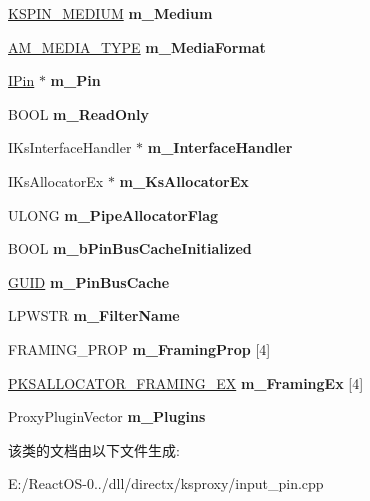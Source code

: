 \begin{DoxyCompactItemize}
\hyperlink{struct_k_s_i_d_e_n_t_i_f_i_e_r}{K\+S\+P\+I\+N\+\_\+\+M\+E\+D\+I\+UM} {\bfseries m\+\_\+\+Medium}
\item 
\mbox{\label{class_c_input_pin_a848d0d972f45dd8cdad72666ea01465e}} 
\hyperlink{struct_a_m___m_e_d_i_a___t_y_p_e}{A\+M\+\_\+\+M\+E\+D\+I\+A\+\_\+\+T\+Y\+PE} {\bfseries m\+\_\+\+Media\+Format}
\item 
\mbox{\label{class_c_input_pin_abe9432ddb342eee4e0a8b57692e96e1b}} 
\hyperlink{interface_i_pin}{I\+Pin} $\ast$ {\bfseries m\+\_\+\+Pin}
\item 
\mbox{\label{class_c_input_pin_ad4ca388cdb28e577d3fd585e6dd40b10}} 
B\+O\+OL {\bfseries m\+\_\+\+Read\+Only}
\item 
\mbox{\label{class_c_input_pin_a3848baf8b5531dd3091b04a546a383ef}} 
I\+Ks\+Interface\+Handler $\ast$ {\bfseries m\+\_\+\+Interface\+Handler}
\item 
\mbox{\label{class_c_input_pin_ab4b94a3ac219fee4452865f2f82672dc}} 
I\+Ks\+Allocator\+Ex $\ast$ {\bfseries m\+\_\+\+Ks\+Allocator\+Ex}
\item 
\mbox{\label{class_c_input_pin_ac9434ea6da868183a63f786d38979540}} 
U\+L\+O\+NG {\bfseries m\+\_\+\+Pipe\+Allocator\+Flag}
\item 
\mbox{\label{class_c_input_pin_ac3128a86803ffafc37390cd39f9588a6}} 
B\+O\+OL {\bfseries m\+\_\+b\+Pin\+Bus\+Cache\+Initialized}
\item 
\mbox{\label{class_c_input_pin_adf16365451b671ccbfc9820ad1818c5b}} 
\hyperlink{interface_g_u_i_d}{G\+U\+ID} {\bfseries m\+\_\+\+Pin\+Bus\+Cache}
\item 
\mbox{\label{class_c_input_pin_a02996afb5abb919124aa3dc7488fd0d3}} 
L\+P\+W\+S\+TR {\bfseries m\+\_\+\+Filter\+Name}
\item 
\mbox{\label{class_c_input_pin_a0469be4f7795cd323ea42450941ff6f7}} 
F\+R\+A\+M\+I\+N\+G\+\_\+\+P\+R\+OP {\bfseries m\+\_\+\+Framing\+Prop} \mbox{[}4\mbox{]}
\item 
\mbox{\label{class_c_input_pin_a6c60afed1c694414a6e044611ceb0f98}} 
\hyperlink{struct_k_s_a_l_l_o_c_a_t_o_r___f_r_a_m_i_n_g___e_x}{P\+K\+S\+A\+L\+L\+O\+C\+A\+T\+O\+R\+\_\+\+F\+R\+A\+M\+I\+N\+G\+\_\+\+EX} {\bfseries m\+\_\+\+Framing\+Ex} \mbox{[}4\mbox{]}
\item 
\mbox{\label{class_c_input_pin_abcadaee2dee3d3f5dbd16dad4ade753f}} 
Proxy\+Plugin\+Vector {\bfseries m\+\_\+\+Plugins}
\end{DoxyCompactItemize}


该类的文档由以下文件生成\+:\begin{DoxyCompactItemize}
\item 
E\+:/\+React\+O\+S-\/0../dll/directx/ksproxy/input\+\_\+pin.\+cpp\end{DoxyCompactItemize}
